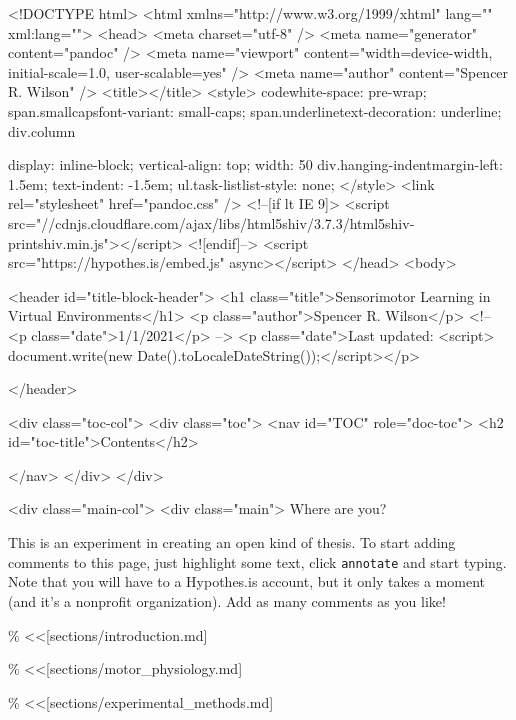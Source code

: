 <!DOCTYPE html>
<html xmlns="http://www.w3.org/1999/xhtml" lang="" xml:lang="">
  <head>
    <meta charset="utf-8" />
    <meta name="generator" content="pandoc" />
    <meta name="viewport" content="width=device-width, initial-scale=1.0, user-scalable=yes" />
        <meta name="author" content="Spencer R. Wilson" />
                <title></title>
    <style>
    code{white-space: pre-wrap;}
    span.smallcaps{font-variant: small-caps;}
    span.underline{text-decoration: underline;}
    div.column{display: inline-block; vertical-align: top; width: 50%
    div.hanging-indent{margin-left: 1.5em; text-indent: -1.5em;}
    ul.task-list{list-style: none;}
    </style>
        <link rel="stylesheet" href="pandoc.css" />
            <!--[if lt IE 9]>
    <script src="//cdnjs.cloudflare.com/ajax/libs/html5shiv/3.7.3/html5shiv-printshiv.min.js"></script>
    <![endif]-->
        <script src="https://hypothes.is/embed.js" async></script>
      </head>
  <body>
      
            <header id="title-block-header">
        <h1 class="title">Sensorimotor Learning in Virtual
Environments</h1>
                        <p class="author">Spencer R. Wilson</p>
                        <!-- <p class="date">1/1/2021</p> -->
        <p class="date">Last updated: <script> document.write(new Date().toLocaleDateString());</script></p>

              </header>
      
            <div class="toc-col">
        <div class="toc">
          <nav id="TOC" role="doc-toc">
                        <h2 id="toc-title">Contents</h2>
                        
          </nav>
        </div>
      </div>
      
      <div class="main-col">
          <div class="main">
            Where are you?

            This is an experiment in creating an open kind of thesis. To
            start adding comments to this page, just highlight some
            text, click \texttt{annotate} and start typing. Note that
            you will have to a Hypothes.is account, but it only takes a
            moment (and it's a nonprofit organization). Add as many
            comments as you like!

            \% \textless\textless{[}sections/introduction.md{]}

            \% \textless\textless{[}sections/motor\_physiology.md{]}

            \% \textless\textless{[}sections/experimental\_methods.md{]}

}

